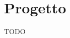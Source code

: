 \documentclass{llncs}
\newcommand{\labelsec}[1]{\label{sec:#1}}
\newcommand{\labelssec}[1]{\label{ssec:#1}}
\begin{document}







\section{Progetto}\labelsec{project}
TODO %

\end{document}
